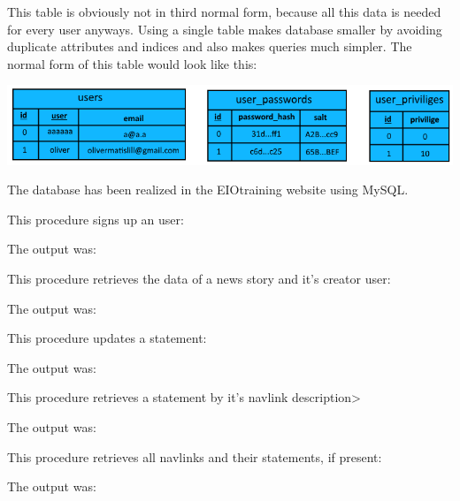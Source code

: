 \documentclass{article}
\begin{document}
This table is obviously not in third normal form, because all this data is needed for every user anyways. Using a single table makes database smaller by avoiding duplicate attributes and indices and also makes queries much simpler. The normal form of this table would look like this:

\begin{center}
\includegraphics[scale=0.65]{normal.png}
\end{center}

The database has been realized in the EIOtraining website using MySQL.

This procedure signs up an user:


The output was:


This procedure retrieves the data of a news story and it's creator user:


The output was:


This procedure updates a statement:


The output was:


This procedure retrieves a statement by it's navlink description>


The output was:


This procedure retrieves all navlinks and their statements, if present:


The output was:

\end{document}
